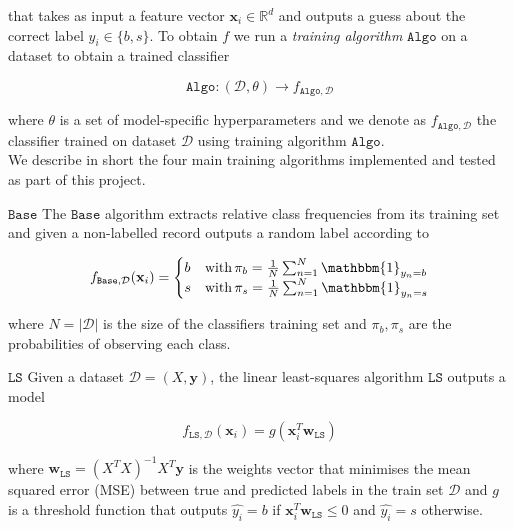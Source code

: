 \documentclass[10pt,conference,compsocconf]{IEEEtran}
\newcommand{\parabf}[1]{\vspace{1mm}\noindent\textbf{#1}}
\newcommand{\Data}{\mathcal{D}}
\newcommand{\features}{\mathbf{x}_i}
\newcommand{\target}{y_i}
\newcommand{\targetset}{\{ b, s \}}
\newcommand{\targetvector}{\mathbf{y}}
\newcommand{\weights}{\mathbf{w}}
\newcommand{\classifier}[2]{f_{#1, #2}}
\newcommand{\Train}{\mathtt{Algo}}
\newcommand{\LeastSquares}{\mathtt{LS}}
\newcommand{\Baseline}{\mathtt{Base}}
\begin{document}
that takes as input a feature vector $\features \in \mathbb{R}^d$ and outputs a guess about the correct label $\target \in \targetset$. To obtain $f$ we run a \emph{training algorithm} $\Train$ on a dataset to obtain a trained classifier

\vspace*{-4mm}
\begin{equation}
	\Train: (\Data, \theta) \rightarrow \classifier{\Train}{\Data}
\end{equation}

where $\theta$ is a set of model-specific hyperparameters and we denote as $\classifier{\Train}{\Data}$ the classifier trained on dataset $\Data$ using training algorithm $\Train$.\\

We describe in short the four main training algorithms implemented and tested as part of this project.

\parabf{$\Baseline$} The $\Baseline$ algorithm extracts relative class frequencies from its training set and given a non-labelled record outputs a random label according to

\vspace*{-4mm}
\begin{equation}
	\classifier{\Baseline}{\Data}(\features) = 
	\begin{cases}
	b &\mbox{with}\,  \pi_b = \frac{1}{N} \sum_{n=1}^N{\mathbbm{1}_{y_n = b}}\\
	s &\mbox{with}\,  \pi_s = \frac{1}{N} \sum_{n=1}^N{\mathbbm{1}_{y_n = s}}
	\end{cases}
\end{equation}

where $N = |\Data|$ is the size of the classifiers training set and $\pi_b, \pi_s$ are the probabilities of observing each class. 

\parabf{$\LeastSquares$} Given a dataset $\Data = (X, \targetvector)$, the linear least-squares algorithm $\LeastSquares$ outputs a model

\vspace*{-4mm}
\begin{equation}
	\classifier{\LeastSquares}{\Data}(\features) = g(\features^T \weights_{\LeastSquares})
\end{equation}

where $\weights_{\LeastSquares} = (X^T X)^{-1}X^T \targetvector$ is the weights vector that minimises the mean squared error (MSE) between true and predicted labels in the train set $\Data$ and $g$ is a threshold function that outputs $\hat{\target} = b$ if $\features^T \weights_{\LeastSquares} \leq 0$ and $\hat{\target} = s$ otherwise.
\end{document}
